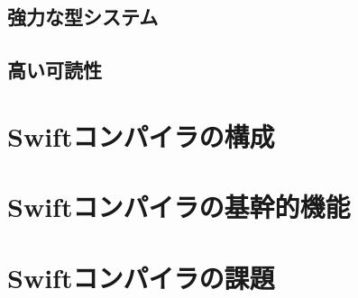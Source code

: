 \subsection{強力な型システム}



\subsection{高い可読性}

\section{Swiftコンパイラの構成}
\label{explain-swift:structure}

\section{Swiftコンパイラの基幹的機能}

\section{Swiftコンパイラの課題}

